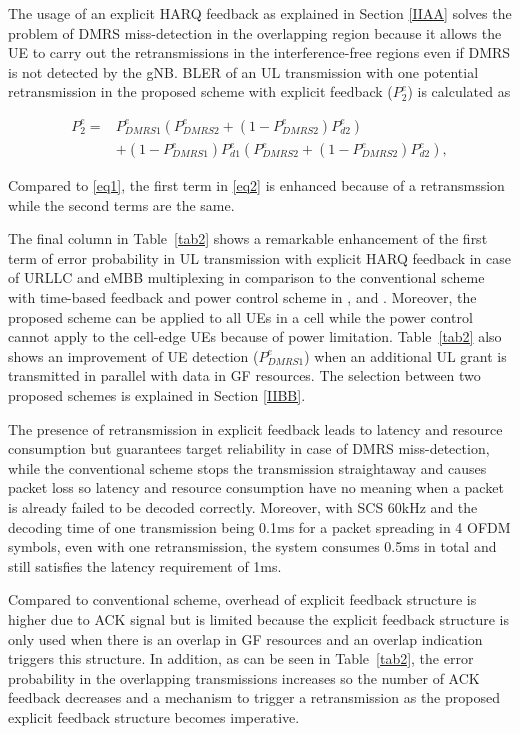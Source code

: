 \documentclass[conference]{IEEEtran}
\begin{document}
The usage of an explicit HARQ feedback as explained in Section \ref{IIAA} solves the problem of DMRS miss-detection in the overlapping region because it allows the UE to carry out the retransmissions in the interference-free regions even if DMRS is not detected by the gNB. BLER of an UL transmission with one potential retransmission in the proposed scheme with explicit feedback ($ P^{e}_{2}$) is calculated as\useshortskip

\begin{equation}
\begin{split}
 P^{e}_{2} =& P^{e}_{DMRS1}(P^{e}_{DMRS2} + (1-P^{e}_{DMRS2})P^{e}_{d2}) \\
        &+ (1-P^{e}_{DMRS1})P^{e}_{d1}(P^{e}_{DMRS2} + (1-P^{e}_{DMRS2})P^{e}_{d2}),\label{eq2}   
\end{split}
\end{equation}

Compared to \eqref{eq1}, the first term in \eqref{eq2} is enhanced because of a retransmssion while the second terms are the same.

The final column in Table~\ref{tab2} shows a remarkable enhancement of the first term of error probability in UL transmission with explicit HARQ feedback in case of URLLC and eMBB multiplexing in comparison to the conventional scheme with time-based feedback and power control scheme in \cite{b1}, \cite{b2} and \cite{b3}. Moreover, the proposed scheme can be applied to all UEs in a cell while the power control cannot apply to the cell-edge UEs because of power limitation. Table~\ref{tab2} also shows an improvement of UE detection ($P^{e}_{DMRS1}$) when an additional UL grant is transmitted in parallel with data in GF resources. The selection between two proposed schemes is explained in Section \ref{IIBB}.
 
The presence of retransmission in explicit feedback leads to latency and resource consumption but guarantees target reliability in case of DMRS miss-detection, while the conventional scheme stops the transmission straightaway and causes packet loss so latency and resource consumption have no meaning when a packet is already failed to be decoded correctly. Moreover, with SCS 60kHz and the decoding time of one transmission being 0.1ms for a packet spreading in 4 OFDM symbols, even with one retransmission, the system consumes 0.5ms in total and still satisfies the latency requirement of 1ms.

 Compared to conventional scheme, overhead of explicit feedback structure is higher due to ACK signal but is limited because the explicit feedback structure is only used when there is an overlap in GF resources and an overlap indication triggers this structure. In addition, as can be seen in Table~\ref{tab2}, the error probability in the overlapping transmissions increases so the number of ACK feedback decreases and a mechanism to trigger a retransmission as the proposed explicit feedback structure becomes imperative.
\end{document}
